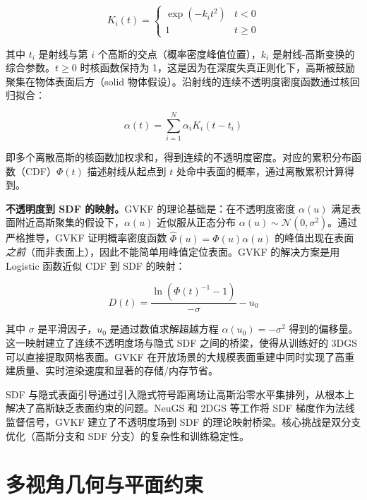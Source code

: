 \begin{equation}
K_i(t) = \begin{cases} \exp(-k_i t^2) & t < 0 \\ 1 & t \geq 0 \end{cases}
\end{equation}

其中 $t_i$ 是射线与第 $i$ 个高斯的交点（概率密度峰值位置），$k_i$ 是射线-高斯变换的综合参数。$t \geq 0$ 时核函数保持为 1，这是因为在深度失真正则化下，高斯被鼓励聚集在物体表面后方（solid 物体假设）。沿射线的连续不透明度密度函数通过核回归拟合：

\begin{equation}
\alpha(t) = \sum_{i=1}^N \alpha_i K_i(t - t_i)
\end{equation}

即多个离散高斯的核函数加权求和，得到连续的不透明度密度。对应的累积分布函数（CDF）$\Phi(t)$ 描述射线从起点到 $t$ 处命中表面的概率，通过离散累积计算得到。

\textbf{不透明度到 SDF 的映射。}GVKF 的理论基础是：在不透明度密度 $\alpha(u)$ 满足表面附近高斯聚集的假设下，$\alpha(u)$ 近似服从正态分布 $\alpha(u) \sim \mathcal{N}(0, \sigma^2)$。通过严格推导，GVKF 证明概率密度函数 $\hat{\Phi}(u)=\Phi(u)\alpha(u)$ 的峰值出现在表面\emph{之前}（而非表面上），因此不能简单用峰值定位表面。GVKF 的解决方案是用 Logistic 函数近似 CDF 到 SDF 的映射：

\begin{equation}
D(t) = \frac{\ln(\Phi(t)^{-1} - 1)}{-\sigma} - u_0
\end{equation}

其中 $\sigma$ 是平滑因子，$u_0$ 是通过数值求解超越方程 $\alpha(u_0) = -\sigma^2$ 得到的偏移量。这一映射建立了连续不透明度场与隐式 SDF 之间的桥梁，使得从训练好的 3DGS 可以直接提取网格表面。GVKF 在开放场景的大规模表面重建中同时实现了高重建质量、实时渲染速度和显著的存储/内存节省。

\begin{takeaway}
SDF 与隐式表面引导通过引入隐式符号距离场让高斯沿零水平集排列，从根本上解决了高斯缺乏表面约束的问题。NeuGS 和 2DGS 等工作将 SDF 梯度作为法线监督信号，GVKF 建立了不透明度场到 SDF 的理论映射桥梁。核心挑战是双分支优化（高斯分支和 SDF 分支）的复杂性和训练稳定性。
\end{takeaway}

\section{多视角几何与平面约束}
\label{sec:04_3}

